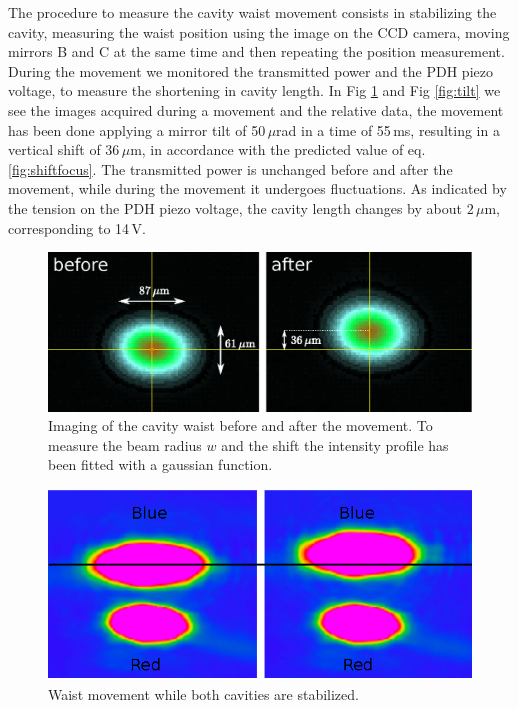 The procedure to measure the cavity waist movement consists in stabilizing the cavity, measuring the waist position using the image on the CCD camera, moving mirrors B and C at the same time and then repeating the position measurement.
During the movement we monitored the transmitted power and the PDH piezo voltage, to measure the shortening in cavity length.
In Fig \ref{fig:imagemov} and Fig \ref{fig:tilt} we see the images acquired during a movement and the relative data, the movement has been done applying a mirror tilt of 50\,$\mu$rad in a time of 55\,ms, resulting in a vertical shift of 36\,$\mu$m, in accordance with the predicted value of eq. \ref{fig:shiftfocus}. The transmitted power is unchanged before and after the movement, while during the movement it undergoes fluctuations. As indicated by the tension on the PDH piezo voltage, the cavity length changes by about $2\,\mu$m, corresponding to 14\,V.
\begin{figure}
	\centering
	\includegraphics[width=1\linewidth]{images/imagemov.eps}
	\caption{Imaging of the cavity waist before and after the movement. To measure the beam radius $w$ and the shift the intensity profile has been fitted with a gaussian function.}
	\label{fig:imagemov}
\end{figure}
\begin{figure}
	\centering
	\includegraphics[width=1\linewidth]{images/doublefocus.eps}
	\caption{Waist movement while both cavities are stabilized.}
	\label{fig:doublefocus}
\end{figure}
